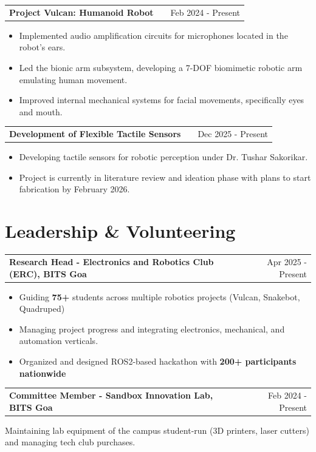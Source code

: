 \documentclass[a4paper,12pt]{article}
\makeatletter
\newenvironment{jobshort}[2]
    {\begin{tabularx}{\linewidth}{@{}l X r@{}} \textbf{#1} & \hfill &  #2 \\[3.75pt] \end{tabularx}}
    {}
\newenvironment{joblong}[2]
    {\begin{tabularx}{\linewidth}{@{}l X r@{}} \textbf{#1} & \hfill &  #2 \\[3.75pt] \end{tabularx}
    \begin{minipage}[t]{\linewidth}
    \begin{itemize}[nosep,after=\strut, leftmargin=1em, itemsep=3pt,label=--]}
    {\end{itemize} \end{minipage}}
\makeatother
\begin{document}
\begin{joblong}{Project Vulcan: Humanoid Robot \href{https://github.com/ERC-BPGC/project-vulcan}{\raisebox{-0.05\height}\faGithub}}{Feb 2024 - Present}
\item Implemented audio amplification circuits for microphones located in the robot's ears.
\item Led the bionic arm subsystem, developing a 7-DOF biomimetic robotic arm emulating human movement.
\item Improved internal mechanical systems for facial movements, specifically eyes and mouth.
\end{joblong}

\begin{joblong}{Development of Flexible Tactile Sensors}{Dec 2025 - Present}
\item Developing tactile sensors for robotic perception under Dr. Tushar Sakorikar.
\item Project is currently in literature review and ideation phase with plans to start fabrication by February 2026.
\end{joblong}

\section{Leadership \& Volunteering}
\begin{jobshort}{Research Head - Electronics and Robotics Club (ERC), BITS Goa}{Apr 2025 - Present}
\begin{itemize} [label={-}]
\item Guiding \textbf{75+} students across multiple robotics projects (Vulcan, Snakebot, Quadruped)
\item Managing project progress and integrating electronics, mechanical, and automation verticals.
\item Organized and designed ROS2-based hackathon with \textbf{200+ participants nationwide}
\end{itemize}
\end{jobshort}

\begin{jobshort}{Committee Member - Sandbox Innovation Lab, BITS Goa}{Feb 2024 - Present}
Maintaining lab equipment of the campus student-run (3D printers, laser cutters) and managing tech club purchases.
\end{jobshort}
\end{document}
